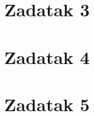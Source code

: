 \documentclass[times, utf8, seminar]{fer}
\begin{document}
\chapter{Zadatak 3}



\chapter{Zadatak 4}

\chapter{Zadatak 5}



\nocite{*}
\end{document}
